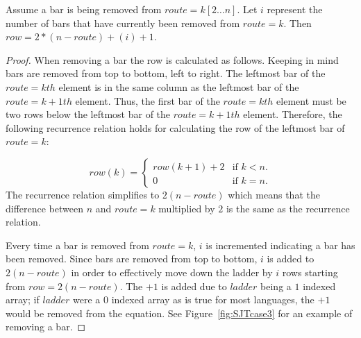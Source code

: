 

\begin{lemma}
  Assume a bar is being removed from $route=k[2 \dots n]$. 
  Let $i$ represent the number of bars that have currently been removed from $route=k$. 
  Then $row=2*(n-route) + (i)+1$.
\end{lemma}
\begin{proof}
  When removing a bar the row is calculated as follows. Keeping in mind bars are removed from top to bottom, left to right.
  The leftmost bar of the $route=kth$ element is in the same column as the leftmost bar of the $route=k+1th$ element.
  Thus, the first bar of the $route=kth$ element must be two rows below the leftmost bar 
  of the $route=k+1th$ element. Therefore, the following recurrence relation holds for calculating the row of the leftmost bar of $route=k$:
  
\begin{equation}
  row(k)=\begin{cases}
    row(k+1)+2 & \text{if $k<n$}.\\
    0 & \text{if $k=n$}.
  \end{cases}
\end{equation}
The recurrence relation simplifies to $2(n-route)$ which means that the difference between $n$ and $route=k$ 
multiplied by $2$ is the same as the recurrence relation.\par 
Every time a bar is removed from $route=k$, $i$ is incremented indicating a bar has been removed. 
Since bars are removed from top to bottom, $i$ is added to $2(n-route)$ in order to effectively move 
down the ladder by $i$ rows starting from $row=2(n-route)$. The $+1$ is added due to $ladder$ being a 
$1$ indexed array; if $ladder$ were a $0$ indexed array as is true for most languages, the $+1$
would be removed from the equation.
See Figure~\ref{fig:SJTcase3} for an example of removing a bar.\pagebreak
\end{proof}

